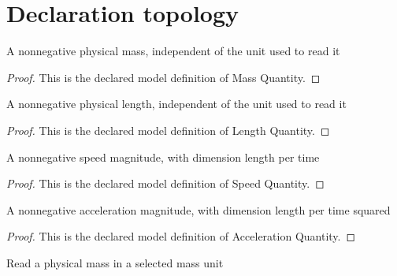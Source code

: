 \section{Declaration topology}
\begin{definition}
  \label{def:physics:phyx-mini-0766:phyxminiproblems-problemphyxmini0766-massquantity}
  A nonnegative physical mass, independent of the unit used to read it
\end{definition}
\begin{proof}
  This is the declared model definition of Mass Quantity.
\end{proof}
\begin{definition}
  \label{def:physics:phyx-mini-0766:phyxminiproblems-problemphyxmini0766-lengthquantity}
  A nonnegative physical length, independent of the unit used to read it
\end{definition}
\begin{proof}
  This is the declared model definition of Length Quantity.
\end{proof}
\begin{definition}
  \label{def:physics:phyx-mini-0766:phyxminiproblems-problemphyxmini0766-speedquantity}
  A nonnegative speed magnitude, with dimension length per time
\end{definition}
\begin{proof}
  This is the declared model definition of Speed Quantity.
\end{proof}
\begin{definition}
  \label{def:physics:phyx-mini-0766:phyxminiproblems-problemphyxmini0766-accelerationquantity}
  A nonnegative acceleration magnitude, with dimension length per time squared
\end{definition}
\begin{proof}
  This is the declared model definition of Acceleration Quantity.
\end{proof}
\begin{definition}
  \label{def:physics:phyx-mini-0766:phyxminiproblems-problemphyxmini0766-massreadout}
  Read a physical mass in a selected mass unit
\end{definition}
